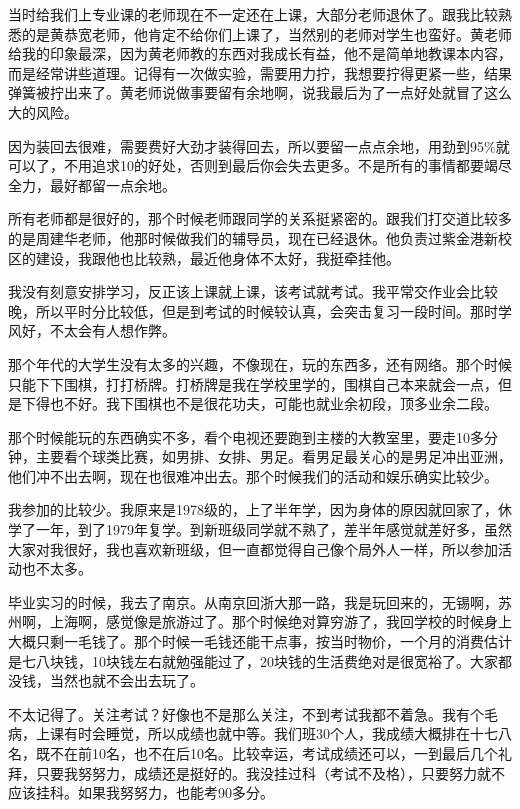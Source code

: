 当时给我们上专业课的老师现在不一定还在上课，大部分老师退休了。跟我比较熟悉的是黄恭宽老师，他肯定不给你们上课了，当然别的老师对学生也蛮好。黄老师给我的印象最深，因为黄老师教的东西对我成长有益，他不是简单地教课本内容，而是经常讲些道理。记得有一次做实验，需要用力拧，我想要拧得更紧一些，结果弹簧被拧出来了。黄老师说做事要留有余地啊，说我最后为了一点好处就冒了这么大的风险。

因为装回去很难，需要费好大劲才装得回去，所以要留一点点余地，用劲到95\%就可以了，不用追求10的好处，否则到最后你会失去更多。不是所有的事情都要竭尽全力，最好都留一点余地。

所有老师都是很好的，那个时候老师跟同学的关系挺紧密的。跟我们打交道比较多的是周建华老师，他那时候做我们的辅导员，现在已经退休。他负责过紫金港新校区的建设，我跟他也比较熟，最近他身体不太好，我挺牵挂他。


我没有刻意安排学习，反正该上课就上课，该考试就考试。我平常交作业会比较晚，所以平时分比较低，但是到考试的时候较认真，会突击复习一段时间。那时学风好，不太会有人想作弊。

那个年代的大学生没有太多的兴趣，不像现在，玩的东西多，还有网络。那个时候只能下下围棋，打打桥牌。打桥牌是我在学校里学的，围棋自己本来就会一点，但是下得也不好。我下围棋也不是很花功夫，可能也就业余初段，顶多业余二段。

那个时候能玩的东西确实不多，看个电视还要跑到主楼的大教室里，要走10多分钟，主要看个球类比赛，如男排、女排、男足。看男足最关心的是男足冲出亚洲，他们冲不出去啊，现在也很难冲出去。那个时候我们的活动和娱乐确实比较少。


我参加的比较少。我原来是1978级的，上了半年学，因为身体的原因就回家了，休学了一年，到了1979年复学。到新班级同学就不熟了，差半年感觉就差好多，虽然大家对我很好，我也喜欢新班级，但一直都觉得自己像个局外人一样，所以参加活动也不太多。

毕业实习的时候，我去了南京。从南京回浙大那一路，我是玩回来的，无锡啊，苏州啊，上海啊，感觉像是旅游过了。那个时候绝对算穷游了，我回学校的时候身上大概只剩一毛钱了。那个时候一毛钱还能干点事，按当时物价，一个月的消费估计是七八块钱，10块钱左右就勉强能过了，20块钱的生活费绝对是很宽裕了。大家都没钱，当然也就不会出去玩了。


不太记得了。关注考试？好像也不是那么关注，不到考试我都不着急。我有个毛病，上课有时会睡觉，所以成绩也就中等。我们班30个人，我成绩大概排在十七八名，既不在前10名，也不在后10名。比较幸运，考试成绩还可以，一到最后几个礼拜，只要我努努力，成绩还是挺好的。我没挂过科（考试不及格），只要努力就不应该挂科。如果我努努力，也能考90多分。

